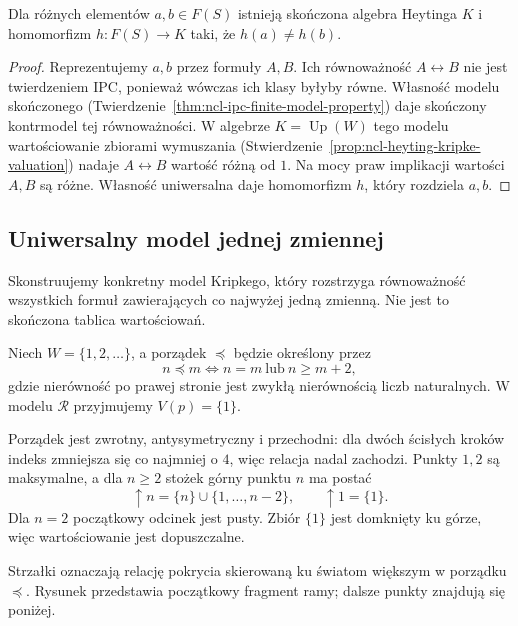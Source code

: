 \begin{twierdzenie}
\label{thm:ncl-heyting-free-residually-finite}
Dla różnych elementów $a,b\in F(S)$ istnieją
skończona algebra Heytinga $K$ i homomorfizm
$h:F(S)\to K$ taki, że $h(a)\ne h(b)$.
\end{twierdzenie}
\begin{proof}
Reprezentujemy $a,b$ przez formuły $A,B$.
Ich równoważność $A\leftrightarrow B$ nie jest
twierdzeniem IPC, ponieważ wówczas ich klasy
byłyby równe.
Własność modelu skończonego
(Twierdzenie~\ref{thm:ncl-ipc-finite-model-property})
daje skończony kontrmodel tej równoważności.
W algebrze $K=\operatorname{Up}(W)$ tego modelu
wartościowanie zbiorami wymuszania
(Stwierdzenie~\ref{prop:ncl-heyting-kripke-valuation})
nadaje $A\leftrightarrow B$ wartość różną od $1$.
Na mocy praw implikacji wartości $A,B$ są różne.
Własność uniwersalna daje homomorfizm $h$,
który rozdziela $a,b$.
\end{proof}

\subsection{Uniwersalny model jednej zmiennej}

Skonstruujemy konkretny model Kripkego, który
rozstrzyga równoważność wszystkich formuł
zawierających co najwyżej jedną zmienną.
Nie jest to skończona tablica wartościowań.

\begin{definicja}
\label{def:ncl-heyting-rn-frame}
Niech $W=\{1,2,\ldots\}$, a porządek $\preceq$
będzie określony przez
\[
 n\preceq m\iff n=m\ \text{lub}\ n\geq m+2,
\]
gdzie nierówność po prawej stronie jest zwykłą
nierównością liczb naturalnych.
W modelu $\mathcal R$ przyjmujemy $V(p)=\{1\}$.
\end{definicja}
Porządek jest zwrotny, antysymetryczny i przechodni:
dla dwóch ścisłych kroków indeks zmniejsza się
co najmniej o $4$, więc relacja nadal zachodzi.
Punkty $1,2$ są maksymalne, a dla $n\geq2$
stożek górny punktu $n$ ma postać
\[
 \uparrow n=\{n\}\cup\{1,\ldots,n-2\},
 \qquad \uparrow1=\{1\}.
\]
Dla $n=2$ początkowy odcinek jest pusty.
Zbiór $\{1\}$ jest domknięty ku górze,
więc wartościowanie jest dopuszczalne.

\begin{center}
\end{center}
Strzałki oznaczają relację pokrycia skierowaną
ku światom większym w porządku $\preceq$.
Rysunek przedstawia początkowy fragment ramy;
dalsze punkty znajdują się poniżej.

